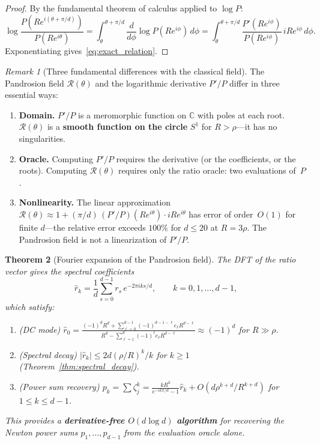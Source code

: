 \documentclass[10pt,a4paper,oneside]{book}
\newtheorem{theorem}{Theorem}[chapter]
\theoremstyle{definition}
\theoremstyle{remark}
\newtheorem{remark}[theorem]{Remark}
\newcommand{\CC}{\mathbb{C}}
\begin{document}
\begin{proof}
By the fundamental theorem of calculus applied to $\log P$:
\[
\log\frac{P(Re^{i(\theta+\pi/d)})}{P(Re^{i\theta})} = \int_\theta^{\theta+\pi/d} \frac{d}{d\phi}\log P(Re^{i\phi})\,d\phi = \int_\theta^{\theta+\pi/d} \frac{P'(Re^{i\phi})}{P(Re^{i\phi})}\,iRe^{i\phi}\,d\phi.
\]
Exponentiating gives~\eqref{eq:exact_relation}.
\end{proof}

\begin{remark}[Three fundamental differences with the classical field]
The Pandrosion field $\mathcal{R}(\theta)$ and the logarithmic derivative $P'/P$ differ in three essential ways:
\begin{enumerate}
\item \textbf{Domain.}  $P'/P$ is a meromorphic function on $\CC$ with poles at each root.  $\mathcal{R}(\theta)$ is a \textbf{smooth function on the circle} $S^1$ for $R > \rho$---it has no singularities.
\item \textbf{Oracle.}  Computing $P'/P$ requires the derivative (or the coefficients, or the roots).  Computing $\mathcal{R}(\theta)$ requires only the ratio oracle: two evaluations of~$P$.
\item \textbf{Nonlinearity.}  The linear approximation $\mathcal{R}(\theta) \approx 1 + (\pi/d)\,(P'/P)(Re^{i\theta})\cdot iRe^{i\theta}$ has error of order~$O(1)$ for finite $d$---the relative error exceeds $100\%$ for $d \leq 20$ at $R = 3\rho$.  The Pandrosion field is not a linearization of $P'/P$.
\end{enumerate}
\end{remark}

\begin{theorem}[Fourier expansion of the Pandrosion field]
\label{thm:fourier_field}
The DFT of the ratio vector gives the spectral coefficients
\begin{equation}
\hat{r}_k = \frac{1}{d}\sum_{s=0}^{d-1} r_s\, e^{-2\pi iks/d}, \qquad k = 0, 1, \ldots, d-1,
\end{equation}
which satisfy:
\begin{enumerate}
\item (DC mode) $\hat{r}_0 = \displaystyle\frac{(-1)^d R^d + \sum_{\ell=0}^{d-1}(-1)^{d-1-\ell} e_\ell R^{d-\ell}}{R^d - \sum_{\ell=1}^d (-1)^\ell e_\ell R^{d-\ell}} \approx (-1)^d$ for $R \gg \rho$.
\item (Spectral decay) $|\hat{r}_k| \leq 2d(\rho/R)^k/k$ for $k \geq 1$ (Theorem~\ref{thm:spectral_decay}).
\item (Power sum recovery) $p_k = \sum \zeta_j^k = \frac{kR^k}{e^{-ik\pi/d} - 1}\hat{r}_k + O(d\rho^{k+d}/R^{k+d})$ for $1 \leq k \leq d-1$.
\end{enumerate}
This provides a \textbf{derivative-free $O(d\log d)$ algorithm} for recovering the Newton power sums $p_1, \ldots, p_{d-1}$ from the evaluation oracle alone.
\end{theorem}
\end{document}
